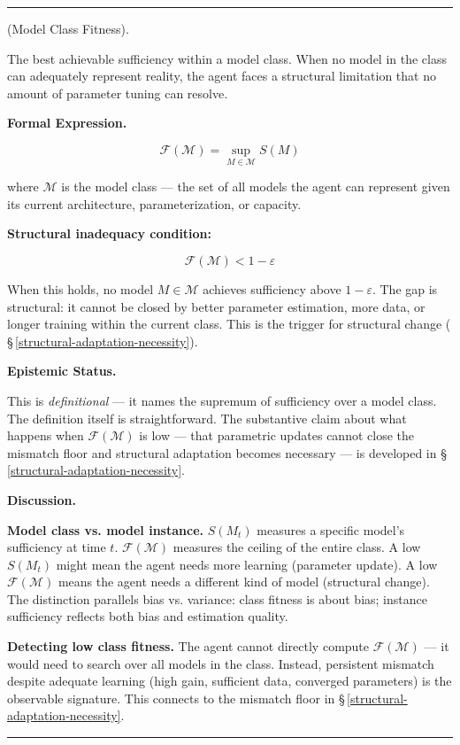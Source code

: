 \documentclass[11pt,oneside]{article}
\newcounter{claim}[section]
\renewcommand{\theclaim}{\thesection.\arabic{claim}}
\newenvironment{segment}[2]{%
  \refstepcounter{claim}%
  \bigskip\noindent\hrule\smallskip
  \noindent{\bfseries #1~\theclaim}\enskip(#2).\par\smallskip
  \noindent\ignorespaces
}{%
  \par\smallskip\noindent\hrule\bigskip
}
\newenvironment{definition}[1][]{\begin{segment}{Definition}{#1}}{\end{segment}}
\begin{document}
\begin{definition}[Model Class Fitness]
\label{model-class-fitness}
The best achievable sufficiency within a model class. When no model in the class can adequately represent reality, the agent faces a structural limitation that no amount of parameter tuning can resolve.



\medskip\noindent\textbf{Formal Expression.}



$$\mathcal{F}(\mathcal{M}) = \sup_{M \in \mathcal{M}} S(M)$$

where $\mathcal{M}$ is the model class — the set of all models the agent can represent given its current architecture, parameterization, or capacity.

\textbf{Structural inadequacy condition:}

$$\mathcal{F}(\mathcal{M}) < 1 - \varepsilon$$

When this holds, no model $M \in \mathcal{M}$ achieves sufficiency above $1 - \varepsilon$. The gap is structural: it cannot be closed by better parameter estimation, more data, or longer training within the current class. This is the trigger for structural change ( \S\,\ref{structural-adaptation-necessity}).


\medskip\noindent\textbf{Epistemic Status.}


This is \textit{definitional} — it names the supremum of sufficiency over a model class. The definition itself is straightforward. The substantive claim about what happens when $\mathcal{F}(\mathcal{M})$ is low — that parametric updates cannot close the mismatch floor and structural adaptation becomes necessary — is developed in \S\,\ref{structural-adaptation-necessity}.


\medskip\noindent\textbf{Discussion.}


\textbf{Model class vs. model instance.} $S(M_t)$ measures a specific model's sufficiency at time $t$. $\mathcal{F}(\mathcal{M})$ measures the ceiling of the entire class. A low $S(M_t)$ might mean the agent needs more learning (parameter update). A low $\mathcal{F}(\mathcal{M})$ means the agent needs a different kind of model (structural change). The distinction parallels bias vs. variance: class fitness is about bias; instance sufficiency reflects both bias and estimation quality.

\textbf{Detecting low class fitness.} The agent cannot directly compute $\mathcal{F}(\mathcal{M})$ — it would need to search over all models in the class. Instead, persistent mismatch despite adequate learning (high gain, sufficient data, converged parameters) is the observable signature. This connects to the mismatch floor in \S\,\ref{structural-adaptation-necessity}.

\end{definition}
\end{document}
